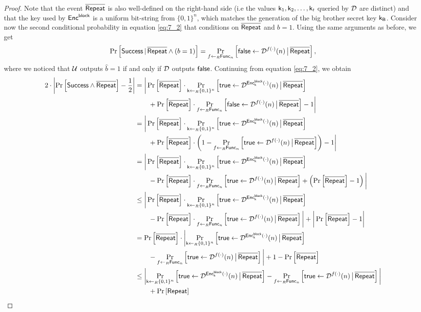 \begin{proof}
Note that the event $\pneg{\rep}$ is also well-defined on the right-hand side (i.e the values $\key_1,\key_2,\ldots,\key_t$ queried by $\dist$ are distinct) and that the key used by $\EncBlock$ is a uniform bit-string from $\{0,1\}^n$, which matches the generation of the big brother secret key $\bbk$. Consider now the second conditional probability in equation \ref{eq:7_2} that conditions on $\pneg{\rep}$ and $b = 1$. Using the same arguments as before, we get
\begin{align*}
	\condprob{\success}{\pneg{\rep}\pand(b=1)} = \condprobb{\false\leftarrow\dist^{f(\cdot)}(n)}{\pneg{\rep}}{f\unileft\func_n},
\end{align*}
where we noticed that $\user$ outputs $\hat{b} = 1$ if and only if $\dist$ outputs $\false$. Continuing from equation \ref{eq:7_2}, we obtain
\begin{align}
2\cdot \left\vert \prob{\success\pand \pneg{\rep}} - \frac{1}{2}\right\vert & = \bigg\vert \prob{\pneg{\rep}}\cdot\condprobb{\true\leftarrow\dist^{\Enc{\key}(\cdot)}(n)}{\pneg{\rep}}{\key\unileft\{0,1\}^n} \nonumber \\
	& \qquad + \prob{\pneg{\rep}}\cdot\condprobb{\false\leftarrow\dist^{f(\cdot)}(n)}{\pneg{\rep}}{f\unileft\func_n} - 1 \bigg\vert \nonumber \\
	& = \bigg\vert \prob{\pneg{\rep}}\cdot\condprobb{\true\leftarrow\dist^{\Enc{\key}(\cdot)}(n)}{\pneg{\rep}}{\key\unileft\{0,1\}^n} \nonumber \\
	& \qquad + \prob{\pneg{\rep}}\cdot\left(1-\condprobb{\true\leftarrow\dist^{f(\cdot)}(n)}{\pneg{\rep}}{f\unileft\func_n}\right) - 1 \bigg\vert \nonumber \\
	& = \bigg\vert \prob{\pneg{\rep}}\cdot\condprobb{\true\leftarrow\dist^{\Enc{\key}(\cdot)}(n)}{\pneg{\rep}}{\key\unileft\{0,1\}^n} \nonumber \\ 
	& \qquad - \prob{\pneg{\rep}}\cdot\condprobb{\true\leftarrow\dist^{f(\cdot)}(n)}{\pneg{\rep}}{f\unileft\func_n} +\left(\prob{\pneg{\rep}} - 1\right) \bigg\vert \nonumber \\
	& \leq \bigg\vert \prob{\pneg{\rep}}\cdot\condprobb{\true\leftarrow\dist^{\Enc{\key}(\cdot)}(n)}{\pneg{\rep}}{\key\unileft\{0,1\}^n} \nonumber \\ 
	& \qquad - \prob{\pneg{\rep}}\cdot\condprobb{\true\leftarrow\dist^{f(\cdot)}(n)}{\pneg{\rep}}{f\unileft\func_n} \bigg\vert + \bigg\vert \prob{\pneg{\rep}} - 1 \bigg\vert \nonumber \\
	& = \prob{\pneg{\rep}}\cdot\bigg\vert \condprobb{\true\leftarrow\dist^{\Enc{\key}(\cdot)}(n)}{\pneg{\rep}}{\key\unileft\{0,1\}^n} \nonumber \\
	& \qquad - \condprobb{\true\leftarrow\dist^{f(\cdot)}(n)}{\pneg{\rep}}{f\unileft\func_n} \bigg\vert + 1 - \prob{\pneg{\rep}} \nonumber \\
	& \leq \bigg\vert \condprobb{\true\leftarrow\dist^{\Enc{\key}(\cdot)}(n)}{\pneg{\rep}}{\key\unileft\{0,1\}^n} - \condprobb{\true\leftarrow\dist^{f(\cdot)}(n)}{\pneg{\rep}}{f\unileft\func_n} \bigg\vert \nonumber \\
\label{eq:7_3}	& \qquad  + \prob{\rep} 
\end{align}


\end{proof}
